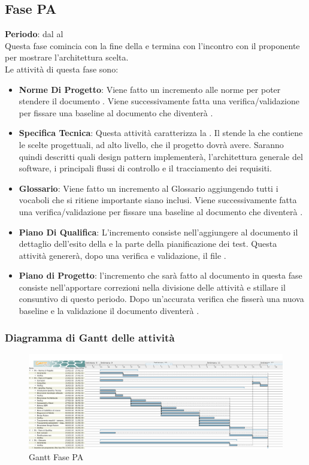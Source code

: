 \subsection{Fase PA}
	\textbf{Periodo}: dal  al  \\Questa fase comincia con la fine della  e termina con l'incontro con il proponente per mostrare l'architettura scelta. \\Le attività di questa fase sono:
	\begin{itemize}
		\item \textbf{Norme Di Progetto}: Viene fatto un incremento alle norme per poter stendere il documento . Viene successivamente fatta una verifica/validazione per fissare una baseline al documento che diventerà .
		\item \textbf{Specifica Tecnica}: Questa attività caratterizza la . Il  stende la  che contiene le scelte progettuali, ad alto livello, che il progetto dovrà avere. Saranno quindi descritti quali design pattern \projectname{} implementerà, l'architettura generale del software, i principali flussi di controllo e il tracciamento dei requisiti.
		\item \textbf{Glossario}: Viene fatto un incremento al Glossario aggiungendo tutti i vocaboli che si ritiene importante siano inclusi. Viene successivamente fatta una verifica/validazione per fissare una baseline al documento che diventerà .
		\item \textbf{Piano Di Qualifica}: L'incremento consiste nell'aggiungere al documento  il dettaglio dell'esito della  e la parte della pianificazione dei test. Questa attività genererà, dopo una verifica e validazione, il file .
		\item \textbf{Piano di Progetto}: l'incremento che sarà fatto al documento  in questa fase consiste nell'apportare correzioni nella divisione delle attività e stillare il consuntivo di questo periodo. Dopo un'accurata verifica che fisserà una nuova baseline e la validazione il documento diventerà .
	\end{itemize}
	\subsubsection{Diagramma di Gantt delle attività}
	\begin{figure}\centering
		\includegraphics[scale=0.27]{PianoDiProgetto/Pics/FasePA.png}
	\caption{Gantt Fase PA}
\end{figure}